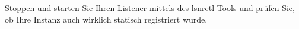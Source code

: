     \item Stoppen und starten Sie Ihren Listener mittels des lsnrctl-Tools und prüfen Sie, ob Ihre Instanz auch wirklich statisch registriert wurde.
